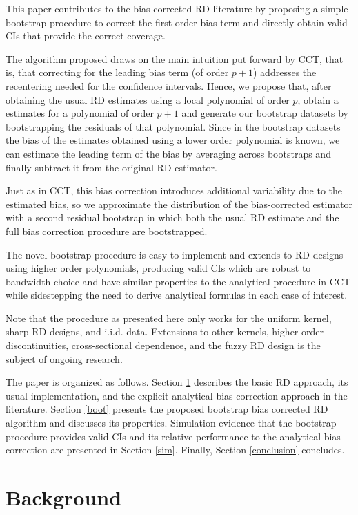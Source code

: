 \documentclass[12pt,fleqn]{article}
\begin{document}
This paper contributes to the bias-corrected RD literature by proposing a simple
bootstrap procedure to correct the first order bias term and directly obtain 
valid CIs that provide the correct coverage.

The algorithm proposed draws on the main intuition put forward by CCT, that is, that correcting for the leading bias term (of order $p+1$) addresses the recentering needed for the confidence intervals. Hence, we propose that, after obtaining the usual RD estimates using a local polynomial of order $p$, obtain a estimates for a polynomial of order $p+1$ and generate our bootstrap datasets by bootstrapping the residuals of that polynomial. Since in the bootstrap datasets the bias of the estimates obtained using a lower order polynomial is known, we can estimate the leading term of the bias by averaging across bootstraps and finally subtract it from the original RD estimator.

Just as in CCT, this bias correction introduces additional variability due to the estimated bias, so we approximate the distribution of the bias-corrected estimator with a second residual bootstrap in which both the usual RD estimate and the full bias correction procedure are bootstrapped.

The novel bootstrap procedure is easy to implement and extends to RD designs 
using higher order polynomials, producing valid CIs which are robust to 
bandwidth choice and have similar properties to the analytical procedure in 
CCT while sidestepping the need to derive analytical formulas in each case of interest.

Note that the procedure as presented here only works for the uniform kernel, sharp RD designs, and i.i.d. data. Extensions to other kernels, higher order discontinuities, cross-sectional dependence, and the fuzzy RD design is the subject of ongoing research.

The paper is organized as follows. Section \ref{background} describes the basic
RD approach, its usual implementation, and the explicit analytical bias 
correction approach in the literature. Section \ref{boot} presents the proposed 
bootstrap bias corrected RD algorithm and discusses its properties. Simulation
evidence that the bootstrap procedure provides valid CIs and its relative 
performance to the analytical bias correction are presented in Section \ref{sim}.
Finally, Section \ref{conclusion} concludes.

\section{Background}\label{background}
\end{document}
